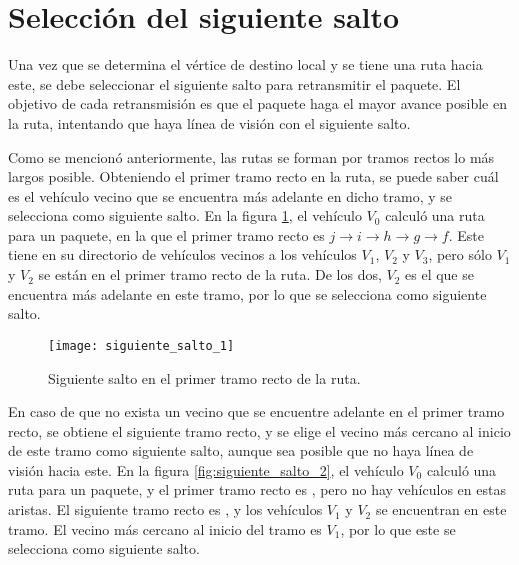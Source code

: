 \section{Selección del siguiente salto}
\label{subsec:seleccion_siguiente_salto}

Una vez que se determina el vértice de destino local y se tiene una ruta hacia
este, se debe seleccionar el siguiente salto para retransmitir el paquete. El
objetivo de cada retransmisión es que el paquete haga el mayor avance posible en
la ruta, intentando que haya línea de visión con el siguiente salto.

Como se mencionó anteriormente, las rutas se forman por tramos rectos lo más
largos posible. Obteniendo el primer tramo recto en la ruta, se puede saber
cuál es el vehículo vecino que se encuentra más adelante en dicho tramo, y se
selecciona como siguiente salto. En la figura \ref{fig:siguiente_salto_1}, el
vehículo $V_0$ calculó una ruta para un paquete, en la que el primer tramo recto
es $j \rightarrow i \rightarrow h \rightarrow g \rightarrow f$. Este tiene en su
directorio de vehículos vecinos a los vehículos $V_1$, $V_2$ y $V_3$, pero sólo
$V_1$ y $V_2$ se están en el primer tramo recto de la ruta. De los dos, $V_2$ es
el que se encuentra más adelante en este tramo, por lo que se selecciona como
siguiente salto.

\begin{figure}[th!]
\centering
\texttt{[image: siguiente\_salto\_1]}
\decoRule
\caption[Siguiente salto en el primer tramo recto de la ruta]{Siguiente salto
en el primer tramo recto de la ruta.}
\label{fig:siguiente_salto_1}
\end{figure}

En caso de que no exista un vecino que se encuentre adelante en el primer tramo
recto, se obtiene el siguiente tramo recto, y se elige el vecino más cercano al
inicio de este tramo como siguiente salto, aunque sea posible que no haya línea
de visión hacia este. En la figura \ref{fig:siguiente_salto_2}, el vehículo
$V_0$ calculó una ruta para un paquete, y el primer tramo recto es {}, pero no
hay vehículos en estas aristas. El siguiente tramo recto es {}, y los vehículos
$V_1$ y $V_2$ se encuentran en este tramo. El vecino más cercano al inicio del
tramo es $V_1$, por lo que este se selecciona como siguiente salto.


